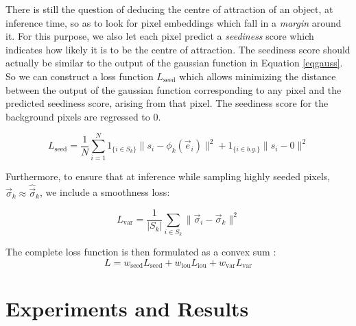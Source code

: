 \documentclass{midl} %
\begin{document}
There is still the question of deducing the centre of attraction of an object, at inference time, so as to look for pixel embeddings which fall in a \emph{margin} around it. For this purpose, we also let each pixel predict a \emph{seediness} score which indicates how likely it is to be the centre of attraction. The seediness score should actually be similar to the output of the gaussian function in Equation \eqref{eqgauss}. So we can construct a loss function $L_{\text{seed}}$ which allows minimizing the distance between the output of the gaussian function corresponding to any pixel and the predicted seediness score, arising from that pixel. The seediness score for the background pixels are regressed to 0.

\begin{equation}
    L_{\text{seed}}=\frac{1}{N} \sum_{i=1}^{N} 1_{\{i \in S_{k}\}} \lVert s_{i} - \phi_{k} (\vec{e}_{i}) \rVert^{2} +  1_{\{i \in b.g.\}} \lVert s_{i} - 0 \rVert^{2}
    \label{eqseed}
\end{equation}

Furthermore, to ensure that at inference while sampling highly seeded pixels, $\vec{\sigma}_{k} \approx \hat{\vec{\sigma}}_{k}$, we include a smoothness loss:


\begin{equation}
    L_{\text{var}}= \frac{1}{\vert S_{k} \vert}\sum_{i \in S_{k}} \lVert \vec{\sigma}_{i} - \vec{\sigma}_{k} \rVert^{2}
    \label{eqvar}
\end{equation}

The complete loss function is then formulated as a convex sum :
\begin{equation}
L = w_{\text{seed}} L_{\text{seed}} + w_{\text{iou}} L_{\text{iou}} + w_{\text{var}} L_{\text{var}}
\end{equation}

\section{Experiments and Results}
\resultsTwoDimensional
\resultsThreeDimensional
\threeDimensionalDataDescription
\end{document}
